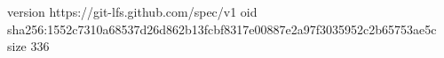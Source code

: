 version https://git-lfs.github.com/spec/v1
oid sha256:1552c7310a68537d26d862b13fcbf8317e00887e2a97f3035952c2b65753ae5c
size 336
